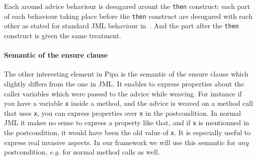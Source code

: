 Each around advice behaviour is desugared arount the {\tt then} construct: each part of each behaviour taking place 
before the {\tt then} construct are desugared with each other as stated for standard JML behaviour in~\cite{clifton02spectators}.
And the part after the {\tt then} construct is given the same treatment.

\paragraph{Semantic of the ensure clause}
The other interesting element in Pipa is the semantic of the ensure clause which slightly differs from the one in
JML. It enables to express properties about the caller variables which were passed to the advice while 
weaving. For instance if you have a variable {\tt x} inside a method, 
and the advice is weaved on a method call that uses {\tt x}, you can express properties over {\tt x} in the 
postcondition. In normal JML it makes no sense to express a property like that, and if {\tt x} is mentionned
in the postcondition, it would have been the old value of {\tt x}. It is especially useful to express real 
invasive aspects. In our framework we will use this semantic for {\it any} postcondition, {\it e.g.} 
for normal method calls as well.
